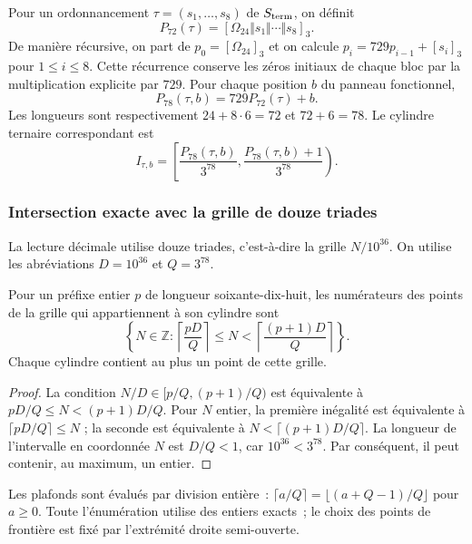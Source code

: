 Pour un ordonnancement $\tau=(s_1,\ldots,s_8)$ de
$\mathcal S_{\rm term}$, on définit
\[
 P_{72}(\tau)=[\Omega_{24}\Vert s_1\Vert\cdots\Vert s_8]_3.
\]
De manière récursive, on part de $p_0=[\Omega_{24}]_3$ et on calcule
$p_i=729p_{i-1}+[s_i]_3$ pour $1\leq i\leq8$. Cette récurrence
conserve les zéros initiaux de chaque bloc par la multiplication
explicite par $729$. Pour chaque position $b$ du panneau fonctionnel,
\[
 P_{78}(\tau,b)=729P_{72}(\tau)+b.
\]
Les longueurs sont respectivement $24+8\cdot6=72$ et $72+6=78$.
Le cylindre ternaire correspondant est
\begin{equation}
 I_{\tau,b}=
 \left[\frac{P_{78}(\tau,b)}{3^{78}},
       \frac{P_{78}(\tau,b)+1}{3^{78}}\right).
 \label{eq:kdes-cilindro}
\end{equation}

\subsubsection{Intersection exacte avec la grille de douze triades}

La lecture décimale utilise douze triades, c'est-à-dire la grille $N/10^{36}$. On utilise les abréviations $D=10^{36}$ et $Q=3^{78}$.

\begin{lemma}
Pour un préfixe entier $p$ de longueur soixante-dix-huit, les numérateurs
des points de la grille qui appartiennent à son cylindre sont
\begin{equation}
 \left\{N\in\mathbb Z:
 \left\lceil\frac{pD}{Q}\right\rceil
 \leq N<
 \left\lceil\frac{(p+1)D}{Q}\right\rceil\right\}.
 \label{eq:kdes-rejilla}
\end{equation}
Chaque cylindre contient au plus un point de cette grille.
\end{lemma}
\begin{proof}
La condition $N/D\in[p/Q,(p+1)/Q)$ est équivalente à
$pD/Q\leq N<(p+1)D/Q$. Pour $N$ entier, la première inégalité
est équivalente à $\lceil pD/Q\rceil\leq N$ ; la seconde est équivalente à
$N<\lceil(p+1)D/Q\rceil$. La longueur de l'intervalle en coordonnée
$N$ est $D/Q<1$, car $10^{36}<3^{78}$. Par conséquent, il peut contenir,
au maximum, un entier.
\end{proof}

Les plafonds sont évalués par division entière :
$\lceil a/Q\rceil=\lfloor(a+Q-1)/Q\rfloor$ pour $a\geq0$.
Toute l'énumération utilise des entiers exacts ; le choix des points de frontière est fixé par l'extrémité droite semi-ouverte.

